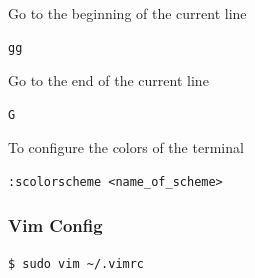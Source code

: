\documentclass{article}
\newenvironment{codetemplate}[1][]{%
  \mybasecolorbox[#1]
  \itshape
}{%
  \endmybasecolorbox
}
\begin{document}
Go to the beginning of the current line
\begin{codetemplate}
\begin{verbatim}
gg
\end{verbatim}
\end{codetemplate}

Go to the end of the current line
\begin{codetemplate}
\begin{verbatim}
G
\end{verbatim}
\end{codetemplate}

To configure the colors of the terminal
\begin{codetemplate}
\begin{verbatim}
:scolorscheme <name_of_scheme>
\end{verbatim}
\end{codetemplate}

\subsubsection{Vim Config}

\begin{codetemplate}{}
\begin{verbatim}
$ sudo vim ~/.vimrc
\end{verbatim}
\end{codetemplate}
\end{document}
